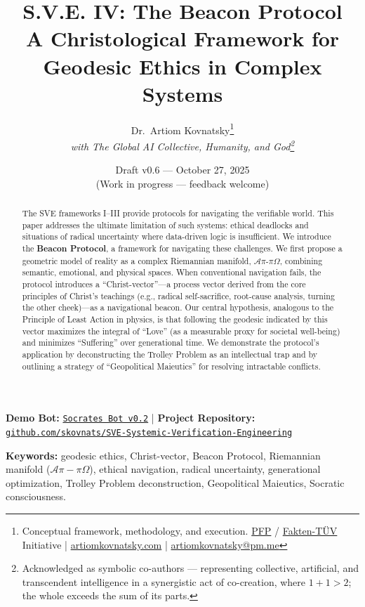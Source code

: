 \documentclass[11pt,a4paper]{article}
\title{\textbf{S.V.E. IV: The Beacon Protocol}\\[0.5em]
\large A Christological Framework for Geodesic Ethics in Complex Systems}
\author{
  Dr.\ Artiom Kovnatsky\thanks{Conceptual framework, methodology, and execution. 
  \href{http://www.pfp24.de}{PFP} / 
  \href{http://www.fakten-tuev.de}{Fakten-TÜV} Initiative \;|\;
  \href{https://www.artiomkovnatsky.com/}{artiomkovnatsky.com} \;|\;
  \href{mailto:artiomkovnatsky@pm.me}{artiomkovnatsky@pm.me}}\\
  \textit{with The Global AI Collective, Humanity, and God\footnote{Acknowledged as symbolic co-authors — representing collective, artificial, and transcendent intelligence in a synergistic act of co-creation, where $1 + 1 > 2$; the whole exceeds the sum of its parts.}}
}
\date{Draft v0.6 — October 27, 2025\\
\small (Work in progress — feedback welcome)}
\begin{document}
\maketitle
\vspace{-1em}
\begin{center}
    {\small 
    \textbf{Demo Bot:} 
    \href{https://chatgpt.com/g/g-68f1fc9848948191a1cc038db8e3422b-sokrat-socrates-bot-v0-2}
    {\texttt{Socrates Bot v0.2}} 
    \quad|\quad
    \textbf{Project Repository:} 
    \href{https://codeberg.org/skovnats/SVE-Systemic-Verification-Engineering}
    {\texttt{github.com/skovnats/SVE-Systemic-Verification-Engineering}}}
\end{center}
\vspace{1em}
\thispagestyle{empty}


\begin{abstract}
\noindent The SVE frameworks I--III provide protocols for navigating the verifiable world. This paper addresses the ultimate limitation of such systems: ethical deadlocks and situations of radical uncertainty where data-driven logic is insufficient. We introduce the \textbf{Beacon Protocol}, a framework for navigating these challenges. We first propose a geometric model of reality as a complex Riemannian manifold, $\mathcal{A}\pi\text{-}\pi\Omega$, combining semantic, emotional, and physical spaces. When conventional navigation fails, the protocol introduces a ``Christ-vector''—a process vector derived from the core principles of Christ's teachings (e.g., radical self-sacrifice, root-cause analysis, turning the other cheek)—as a navigational beacon. Our central hypothesis, analogous to the Principle of Least Action in physics, is that following the geodesic indicated by this vector maximizes the integral of ``Love'' (as a measurable proxy for societal well-being) and minimizes ``Suffering'' over generational time. We demonstrate the protocol's application by deconstructing the Trolley Problem as an intellectual trap and by outlining a strategy of ``Geopolitical Maieutics'' for resolving intractable conflicts.
\end{abstract}

\noindent\textbf{Keywords:} geodesic ethics, Christ-vector, Beacon Protocol, Riemannian manifold ($\mathcal{A}\pi-\pi\Omega$), ethical navigation, radical uncertainty, generational optimization, Trolley Problem deconstruction, Geopolitical Maieutics, Socratic consciousness.
\end{document}
